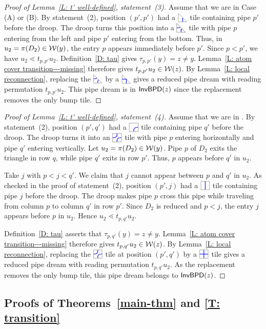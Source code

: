 \documentclass[10pt]{article}
\begin{document}
\begin{proof}[Proof of Lemma~\ref{L: t' well-defined}, statement~(3)]
Assume that we are in Case (A) or (B).
By statement~(2), position $(p',p')$ had a $\CDIAG$ tile containing pipe $p'$
before the droop.
The droop turns this position into a $\EDIAG$ tile with pipe $p$ entering from the left
and pipe $p'$ entering from the bottom.
Thus, in $u_2=\pi(D_2)\in\mathcal{W}(y)$, the entry $p$ appears immediately
before $p'$.
Since $p<p'$, we have $u_2\lessdot t_{p,p'}u_2$.
Definition~\ref{D: tau} gives $\tau_{p,p'}(y)=z\ne y$.
Lemma~\ref{L: atom cover transition---missing} therefore gives
$t_{p,p'}u_2\in\mathcal{W}(z)$.
By Lemma~\ref{L: local reconnection}, replacing the $\EDIAG$ by a
$\PDIAG$ gives a reduced pipe dream with reading permutation $t_{p,p'}u_2$. This pipe dream is in $\mathsf{InvBPD}(z)$
since the replacement removes the only bump tile.
\end{proof}

\begin{proof}[Proof of Lemma~\ref{L: t' well-defined}, statement~(4)]
Assume that we are in \CaseC.
By statement~(2), position $(p',q')$ had a $\CTILE$ tile containing pipe $q'$
before the droop.
The droop turns it into an $\ETILE$ tile with pipe $p$ entering horizontally
and pipe $q'$ entering vertically.
Let $u_2=\pi(D_2)\in\mathcal{W}(y)$.
Pipe $p$ of $D_2$ exits the triangle in row $q$, while pipe $q'$ exits in
row $p'$.
Thus, $p$ appears before $q'$ in $u_2$.

Take $j$ with $p<j<q'$.
We claim that $j$ cannot appear between $p$ and $q'$
in $u_2$.
As checked in the proof of statement~(2), position $(p',j)$ had a $\VTILE$ tile containing pipe $j$ before the droop.
The droop makes pipe $p$ cross this pipe while traveling from column
$p$ to column $q'$ in row $p'$.
Since $D_2$ is reduced and $p<j$, the entry $j$ appears before $p$
in $u_2$.
Hence $u_2\lessdot t_{p,q'}u_2$.

Definition~\ref{D: tau} asserts that $\tau_{p,q'}(y)=z\ne y$.
Lemma~\ref{L: atom cover transition---missing} therefore gives
$t_{p,q'}u_2\in\mathcal{W}(z)$.
By Lemma~\ref{L: local reconnection}, replacing the $\ETILE$ tile at position $(p',q')$ by a
$\PTILE$ tile gives a reduced pipe dream with  reading permutation $t_{p,q'}u_2$.
As the replacement removes the only bump tile, this pipe dream belongs to $\mathsf{InvBPD}(z)$.
\end{proof}

\subsection{Proofs of Theorems~\ref{main-thm} and \ref{T: transition}}
\end{document}
